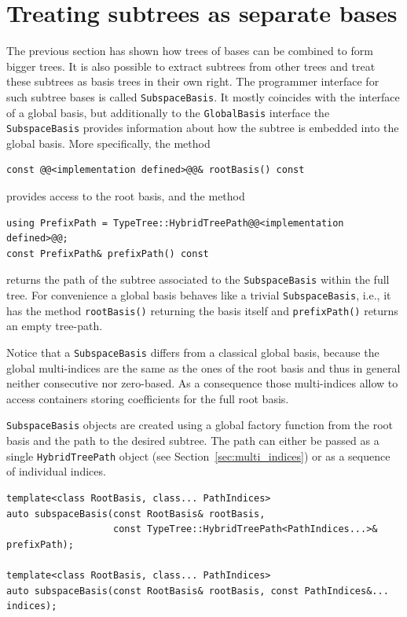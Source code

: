 \documentclass[a4paper,10pt,headings=normal,bibliography=totoc]{scrartcl}
\newcommand{\cpp}[1]{\lstinline[basicstyle=\ttfamily]!#1!}
\begin{document}
\section{Treating subtrees as separate bases}
\label{sec:subtrees}

The previous section has shown how trees of bases can be combined to form
bigger trees.  It is also possible to extract subtrees from other trees
and treat these subtrees as basis trees in their own right.
The programmer interface for such subtree bases is called \cpp{SubspaceBasis}.
It mostly coincides with the interface of a global basis, but additionally
to the \cpp{GlobalBasis} interface the \cpp{SubspaceBasis} provides
information about how the subtree is embedded into the global basis.
More specifically, the method
\begin{lstlisting}[style=Interface]
const @@<implementation defined>@@& rootBasis() const
\end{lstlisting}
provides access to the root basis, and the method
\begin{lstlisting}[style=Interface]
using PrefixPath = TypeTree::HybridTreePath@@<implementation defined>@@;
const PrefixPath& prefixPath() const
\end{lstlisting}
returns the
path of the subtree associated to the \cpp{SubspaceBasis}
within the full tree.
For convenience a global basis behaves like a trivial \cpp{SubspaceBasis},
i.e., it has the method \cpp{rootBasis()} returning the basis itself
and \cpp{prefixPath()} returns an empty tree-path.

Notice that a \cpp{SubspaceBasis} differs from a classical
global basis, because the global multi-indices are the
same as the ones of the root basis and thus in general
neither consecutive nor zero-based. As a consequence those multi-indices
allow to access containers storing coefficients for the
full root basis.

\cpp{SubspaceBasis} objects are created using a global
factory function from the root basis and the path
to the desired subtree. The path can either be passed
as a single \cpp{HybridTreePath} object (see Section~\ref{sec:multi_indices}) or
as a sequence of individual indices.

\begin{lstlisting}[style=Interface]
template<class RootBasis, class... PathIndices>
auto subspaceBasis(const RootBasis& rootBasis,
                   const TypeTree::HybridTreePath<PathIndices...>& prefixPath);

template<class RootBasis, class... PathIndices>
auto subspaceBasis(const RootBasis& rootBasis, const PathIndices&... indices);
\end{lstlisting}
\end{document}
